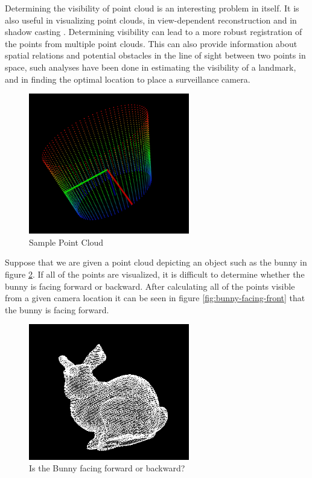 \documentclass[11pt]{article}
\begin{document}
Determining the visibility of point cloud is an interesting problem in itself. It is also useful in visualizing point clouds, in view-dependent reconstruction and in shadow casting \cite{Katz07}. Determining visibility can lead to a more robust registration of the points from multiple point clouds. This can also provide information about spatial relations and potential obstacles in the line of sight between two points in space, such analyses have been done in estimating the visibility of a landmark, and in finding the optimal location to place a surveillance camera.

\pagebreak
\begin{figure}[h]
	\includegraphics[width=7cm]{simple-pcl}
	\centering
	\caption{Sample Point Cloud}
	\label{simple-point-cloud}
\end{figure}

Suppose that we are given a point cloud depicting an object such as the bunny in figure \ref{fig:bunny-facing-which-way}. If all of the points are visualized, it is difficult to determine whether the bunny is facing forward or backward. After calculating all of the points visible from a given camera location it can be seen in figure \ref{fig:bunny-facing-front} that the bunny is facing forward.

\begin{figure}[h]
\includegraphics[width=7cm]{bunny-facing-which-way}
\centering
\caption{Is the Bunny facing forward or backward?}
\label{fig:bunny-facing-which-way}
\end{figure}
\end{document}
